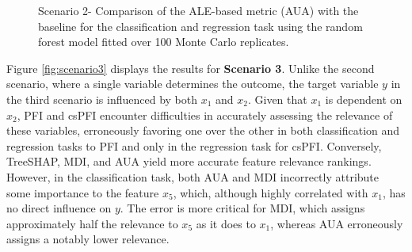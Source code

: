 \begin{figure}[ht!]
\centering
  \caption{Scenario 2- Comparison of the ALE-based metric (AUA) with the baseline for the classification and regression task using the random forest model fitted over 100 Monte Carlo replicates.}
    \label{fig:scenario2}
\end{figure}

Figure \ref{fig:scenario3} displays the results for \textbf{Scenario 3}. Unlike the second scenario, where a single variable determines the outcome, the target variable \(y\) in the third scenario is influenced by both \(x_1\) and \(x_2\). Given that \(x_1\) is dependent on \(x_2\), \gls{PFI} and \gls{csPFI} encounter difficulties in accurately assessing the relevance of these variables, erroneously favoring one over the other in both classification and regression tasks to \gls{PFI} and only in the regression task for \gls{csPFI}. Conversely, TreeSHAP, \gls{MDI}, and \gls{AUA} yield more accurate feature relevance rankings. However, in the classification task, both \gls{AUA} and \gls{MDI} incorrectly attribute some importance to the feature \(x_5\), which, although highly correlated with \(x_1\), has no direct influence on \(y\). The error is more critical for \gls{MDI}, which assigns approximately half the relevance to \(x_5\) as it does to \(x_1\), whereas \gls{AUA} erroneously assigns a notably lower relevance.



